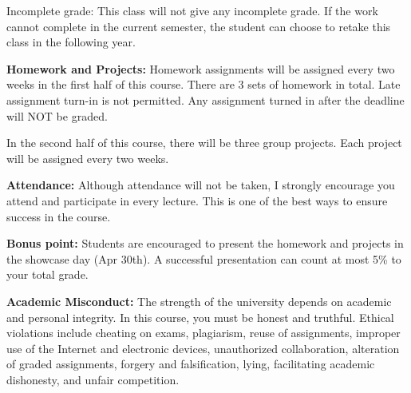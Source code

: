 \documentclass[a4paper,10pt]{article}
\begin{document}
Incomplete grade: This class will not give any
incomplete grade. If the work cannot complete in the
current semester, the student can choose to retake this
class in the following year.




\textbf{Homework and Projects:} Homework assignments will be assigned every two weeks in the first half of this course. There are 3 sets of homework in total. Late assignment turn-in is not permitted. Any assignment turned in after the deadline will NOT be graded. 

In the second half of this course, there will be three group projects. Each project will be assigned every two weeks.  




\textbf{Attendance:} Although attendance will not be taken, I strongly encourage you attend and participate in every lecture. This is one of the best ways to ensure success in the course.

\textbf{Bonus point:} Students are encouraged to present the homework and projects in the showcase day (Apr 30th). A successful presentation can count at most 5\% to your total grade.


\textbf{Academic Misconduct:} The strength of the university depends on academic and personal integrity. In this course, you must be honest 
and truthful. Ethical violations include cheating on exams, plagiarism, reuse of assignments, improper use 
of the Internet and electronic devices, unauthorized collaboration, alteration of graded assignments, forgery 
and falsification, lying, facilitating academic dishonesty, and unfair competition.
\end{document}
